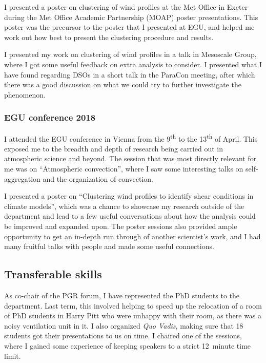 \documentclass[11pt,a4paper]{article}
\newcommand{\ts}{\textsuperscript}
\begin{document}
I presented a poster on clustering of wind profiles at the Met Office in Exeter during the Met Office Academic Partnership (MOAP) poster presentations. This poster was the precursor to the poster that I presented at EGU, and helped me work out how best to present the clustering procedure and results.

I presented my work on clustering of wind profiles in a talk in Mesoscale Group, where I got some useful feedback on extra analysis to consider.  I presented what I have found regarding DSOs in a short talk in the ParaCon meeting, after which there was a good discussion on what we could try to further investigate the phenomenon.

\subsubsection{EGU conference 2018}

I attended the EGU conference in Vienna from the 9\ts{th} to the 13\ts{th} of April. This exposed me to the breadth and depth of research being carried out in atmospheric science and beyond. The session that was most directly relevant for me was on ``Atmospheric convection'', where I saw some interesting talks on self-aggregation and the organization of convection.

I presented a poster on ``Clustering wind profiles to identify shear conditions in climate models'', which was a chance to showcase my research outside of the department and lead to a few useful conversations about how the analysis could be improved and expanded upon. The poster sessions also provided ample opportunity to get an in-depth run through of another scientist's work, and I had many fruitful talks with people and made some useful connections.

\subsection{Transferable skills}
\label{sec:Transferable skills}

As co-chair of the PGR forum, I have represented the PhD students to the department. Last term, this involved helping to speed up the relocation of a room of PhD students in Harry Pitt who were unhappy with their room, as there was a noisy ventilation unit in it. I also organized \textit{Quo Vadis}, making sure that 18 students got their presentations to us on time. I chaired one of the sessions, where I gained some experience of keeping speakers to a strict \SI{12}{minute} time limit.
\end{document}
